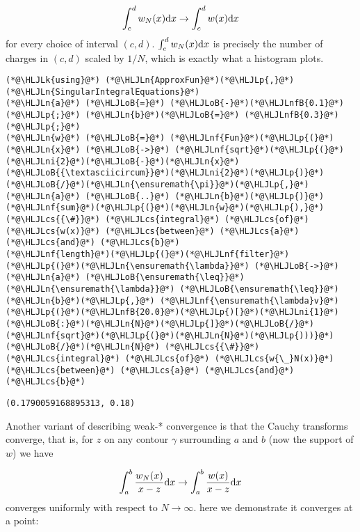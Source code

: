 \documentclass[12pt,landscape]{article}
\newcommand{\HLJLk}[1]{\textcolor[RGB]{148,91,176}{\textbf{#1}}}
\newcommand{\HLJLn}[1]{#1}
\newcommand{\HLJLnf}[1]{\textcolor[RGB]{66,102,213}{#1}}
\newcommand{\HLJLnfB}[1]{\textcolor[RGB]{59,151,46}{#1}}
\newcommand{\HLJLni}[1]{\textcolor[RGB]{59,151,46}{#1}}
\newcommand{\HLJLoB}[1]{\textcolor[RGB]{102,102,102}{\textbf{#1}}}
\newcommand{\HLJLp}[1]{#1}
\newcommand{\HLJLcs}[1]{\textcolor[RGB]{153,153,119}{\textit{#1}}}
\def\D{ {\rm d} }
\def\dx{\D x}
\begin{document}
{\[
   \int_c^d w_N(x) \dx \rightarrow \int_c^d w(x) \dx
\]
for every choice of interval $(c,d)$. $\int_c^d w_N(x) \dx$ is precisely the number of charges in $(c,d)$ scaled by $1/N$,  which is exactly what a histogram plots.


\begin{lstlisting}
(*@\HLJLk{using}@*) (*@\HLJLn{ApproxFun}@*)(*@\HLJLp{,}@*) (*@\HLJLn{SingularIntegralEquations}@*)
(*@\HLJLn{a}@*) (*@\HLJLoB{=}@*) (*@\HLJLoB{-}@*)(*@\HLJLnfB{0.1}@*)(*@\HLJLp{;}@*) (*@\HLJLn{b}@*)(*@\HLJLoB{=}@*) (*@\HLJLnfB{0.3}@*)(*@\HLJLp{;}@*)
(*@\HLJLn{w}@*) (*@\HLJLoB{=}@*) (*@\HLJLnf{Fun}@*)(*@\HLJLp{(}@*)(*@\HLJLn{x}@*) (*@\HLJLoB{->}@*) (*@\HLJLnf{sqrt}@*)(*@\HLJLp{(}@*)(*@\HLJLni{2}@*)(*@\HLJLoB{-}@*)(*@\HLJLn{x}@*)(*@\HLJLoB{{\textasciicircum}}@*)(*@\HLJLni{2}@*)(*@\HLJLp{)}@*)(*@\HLJLoB{/}@*)(*@\HLJLn{\ensuremath{\pi}}@*)(*@\HLJLp{,}@*) (*@\HLJLn{a}@*) (*@\HLJLoB{..}@*) (*@\HLJLn{b}@*)(*@\HLJLp{)}@*)
(*@\HLJLnf{sum}@*)(*@\HLJLp{(}@*)(*@\HLJLn{w}@*)(*@\HLJLp{),}@*)  (*@\HLJLcs{{\#}}@*) (*@\HLJLcs{integral}@*) (*@\HLJLcs{of}@*) (*@\HLJLcs{w(x)}@*) (*@\HLJLcs{between}@*) (*@\HLJLcs{a}@*) (*@\HLJLcs{and}@*) (*@\HLJLcs{b}@*)
(*@\HLJLnf{length}@*)(*@\HLJLp{(}@*)(*@\HLJLnf{filter}@*)(*@\HLJLp{(}@*)(*@\HLJLn{\ensuremath{\lambda}}@*) (*@\HLJLoB{->}@*) (*@\HLJLn{a}@*) (*@\HLJLoB{\ensuremath{\leq}}@*) (*@\HLJLn{\ensuremath{\lambda}}@*) (*@\HLJLoB{\ensuremath{\leq}}@*) (*@\HLJLn{b}@*)(*@\HLJLp{,}@*) (*@\HLJLnf{\ensuremath{\lambda}v}@*)(*@\HLJLp{(}@*)(*@\HLJLnfB{20.0}@*)(*@\HLJLp{)[}@*)(*@\HLJLni{1}@*)(*@\HLJLoB{:}@*)(*@\HLJLn{N}@*)(*@\HLJLp{]}@*)(*@\HLJLoB{/}@*)(*@\HLJLnf{sqrt}@*)(*@\HLJLp{(}@*)(*@\HLJLn{N}@*)(*@\HLJLp{)))}@*)(*@\HLJLoB{/}@*)(*@\HLJLn{N}@*) (*@\HLJLcs{{\#}}@*) (*@\HLJLcs{integral}@*) (*@\HLJLcs{of}@*) (*@\HLJLcs{w{\_}N(x)}@*) (*@\HLJLcs{between}@*) (*@\HLJLcs{a}@*) (*@\HLJLcs{and}@*) (*@\HLJLcs{b}@*)
\end{lstlisting}

\begin{lstlisting}
(0.1790059168895313, 0.18)
\end{lstlisting}


Another variant of describing weak-* convergence is that the Cauchy transforms converge, that is, for $z$ on any  contour $\gamma$ surrounding $a$ and $b$ (now the support of $w$) we have

\[
\int_a^b {w_N(x) \over x - z} \dx \rightarrow \int_a^b {w(x) \over x - z} \dx
\]
converges uniformly with respect to $N \rightarrow \infty$. here we demonstrate it converges at a point:

}
\end{document}

